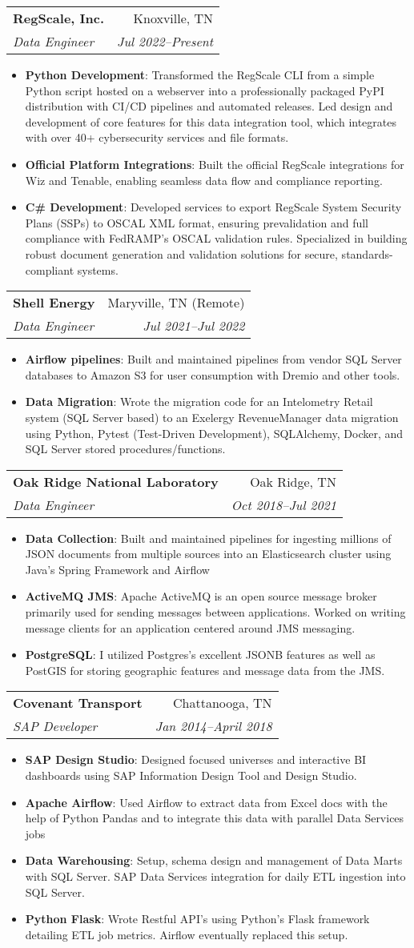 \documentclass[letterpaper,11pt]{article}
\makeatletter
\newcommand{\resumeItem}[2]{
  \item\small{
    \textbf{#1}{: #2 \vspace{-2pt}}
  }
}
\newcommand{\resumeSubheading}[4]{
  \vspace{-1pt}\item
    \begin{tabular*}{0.97\textwidth}[t]{l@{\extracolsep{\fill}}r}
      \textbf{#1} & #2 \\
      \textit{\small#3} & \textit{\small #4} \\
    \end{tabular*}\vspace{-5pt}
}
\newcommand{\resumeItemListStart}{\begin{itemize}}
\newcommand{\resumeItemListEnd}{\end{itemize}\vspace{-5pt}}
\makeatother
\begin{document}
\resumeSubheading
	{RegScale, Inc.}{Knoxville, TN}
	{Data Engineer}{Jul 2022--Present}
	\resumeItemListStart
	\resumeItem{Python Development}
  {Transformed the RegScale CLI from a simple Python script hosted on a webserver into a professionally packaged PyPI distribution with CI/CD pipelines and automated releases. Led design and development of core features for this data integration tool, which integrates with over 40+ cybersecurity services and file formats.}
  \resumeItem{Official Platform Integrations}
	{Built the official RegScale integrations for Wiz and Tenable, enabling seamless data flow and compliance reporting.}
  \resumeItem{C\# Development}
	{Developed services to export RegScale System Security Plans (SSPs) to OSCAL XML format, ensuring prevalidation and full compliance with FedRAMP's OSCAL validation rules. Specialized in building robust document generation and validation solutions for secure, standards-compliant systems.}
	\resumeItemListEnd
    \resumeSubheading
      {Shell Energy}{Maryville, TN (Remote)}
      {Data Engineer}{Jul 2021--Jul 2022}
      \resumeItemListStart
        \resumeItem{Airflow pipelines}
          {Built and maintained pipelines from vendor SQL Server databases to Amazon S3 for user consumption with Dremio and other tools.}
        \resumeItem{Data Migration}
          {Wrote the migration code for an Intelometry Retail system (SQL Server based) to an Exelergy RevenueManager data migration using Python, Pytest (Test-Driven Development), SQLAlchemy, Docker, and SQL Server stored procedures/functions.}
      \resumeItemListEnd

    \resumeSubheading
      {Oak Ridge National Laboratory}{Oak Ridge, TN}
      {Data Engineer}{Oct 2018--Jul 2021}
      \resumeItemListStart
        \resumeItem{Data Collection}
          {Built and maintained pipelines for ingesting millions of JSON documents from multiple sources into an Elasticsearch cluster using Java's Spring Framework and Airflow}
        \resumeItem{ActiveMQ JMS}
          {Apache ActiveMQ is an open source message broker primarily used for sending messages between applications. Worked on writing message clients for an application centered around JMS messaging.}
        \resumeItem{PostgreSQL}
          {I utilized Postgres's excellent JSONB features as well as PostGIS for storing geographic features and message data from the JMS\@.}
      \resumeItemListEnd

    \resumeSubheading
      {Covenant Transport}{Chattanooga, TN}
      {SAP Developer}{Jan 2014--April 2018}
      \resumeItemListStart
        \resumeItem{SAP Design Studio}
          {Designed focused universes and interactive BI dashboards using SAP Information Design Tool and Design Studio.}
        \resumeItem{Apache Airflow}
          {Used Airflow to extract data from Excel docs with the help of Python Pandas and to integrate this data with parallel Data Services jobs}
        \resumeItem{Data Warehousing}
          {Setup, schema design and management of Data Marts with SQL Server. SAP Data Services integration for daily ETL ingestion into SQL Server.}
        \resumeItem{Python Flask}
          {Wrote Restful API’s using Python’s Flask framework detailing ETL job metrics.  Airflow eventually replaced this setup.}
      \resumeItemListEnd
\end{document}
